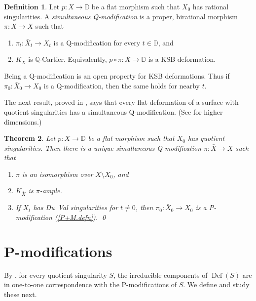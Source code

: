 \documentclass{amsart}
\newtheorem{thm}{Theorem}%
\theoremstyle{definition}
\newtheorem{defn}[thm]{Definition}
\theoremstyle{remark}
\newcommand{\dd}[0]{{\mathbb D}}
\newcommand{\q}[0]{{\mathbb Q}}
\newcommand{\defsp}[0]{\operatorname{Def}}
\begin{document}
\medskip






\begin{defn} \label{sim.Q.mod.defn} Let $p:X\to \dd$ be a flat morphism such that $X_0$ has rational singularities. A {\it simultaneous Q-modification} is a
  proper, birational morphism  $\pi:\bar X\to X$ such that
\begin{enumerate}
       \item $\pi_t:\bar X_t\to X_t$ is a Q-modification for every $t\in \dd$, and
    \item $K_{\bar X}$ is $\q$-Cartier. Equivalently,     $p\circ \pi:\bar X\to \dd$ is a KSB deformation.
\end{enumerate}
Being a Q-modification is an open property for KSB deformations.
Thus if  $\pi_0:\bar X_0\to X_0$ is a Q-modification, then the same holds for nearby $t$.
\end{defn}


The next result, proved in \cite[3.5]{ksb},  says that every flat deformation of a surface  with quotient singularities  has a simultaneous Q-modification.
(See  \cite[5.41]{k-modbook} for higher dimensions.)

\begin{thm}\label{cmod.ksb.thm}
Let $p:X\to \dd$ be a flat morphism such that $X_0$ has quotient singularities. Then there is a unique  simultaneous Q-modification $\pi:\bar X\to X$ such that
  \begin{enumerate}
  \item $\pi$ is an isomorphism over $X\setminus X_0$, and 
        \item $K_{\bar X}$ is  $\pi$-ample.
    \item If $X_t$ has Du~Val singularities for $t\neq 0$, then
 $\pi_0:\bar X_0\to X_0$ is a P-modification  (\ref{P+M.defn}).
      \qed
  \end{enumerate}
\end{thm}






\section{P-modifications}

By \cite[3.9]{ksb}, for every quotient singularity $S$, the irreducible components of $\defsp(S)$ are in one-to-one correspondence with the 
P-modifications of $S$. We define and study these next.
\end{document}
